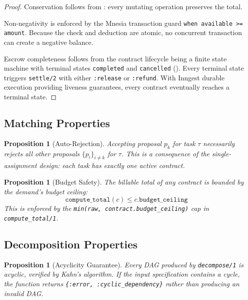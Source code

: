 \documentclass[12pt,a4paper]{article}
\theoremstyle{plain}
\newtheorem{proposition}[theorem]{Proposition}
\theoremstyle{definition}
\begin{document}
\begin{proof}
Conservation follows from : every mutating operation preserves the total.

Non-negativity is enforced by the Mnesia transaction guard \texttt{when available >= amount}. Because the check and deduction are atomic, no concurrent transaction can create a negative balance.

Escrow completeness follows from the contract lifecycle being a finite state machine with terminal states \texttt{completed} and \texttt{cancelled} (). Every terminal state triggers \texttt{settle/2} with either \texttt{:release} or \texttt{:refund}. With Inngest durable execution providing liveness guarantees, every contract eventually reaches a terminal state.
\end{proof}

\subsection{Matching Properties}

\begin{proposition}[Auto-Rejection]\label{prop:auto-reject}
Accepting proposal $p_k$ for task $\tau$ necessarily rejects all other proposals $\{p_i\}_{i \neq k}$ for $\tau$. This is a consequence of the single-assignment design: each task has exactly one active contract.
\end{proposition}

\begin{proposition}[Budget Safety]\label{prop:budget-safety}
The billable total of any contract is bounded by the demand's budget ceiling:
\[
    \texttt{compute\_total}(c) \leq c.\texttt{budget\_ceiling}
\]
This is enforced by the \texttt{min(raw, contract.budget\_ceiling)} cap in \texttt{compute\_total/1}.
\end{proposition}

\subsection{Decomposition Properties}

\begin{proposition}[Acyclicity Guarantee]\label{prop:acyclic}
Every DAG produced by \texttt{decompose/1} is acyclic, verified by Kahn's algorithm. If the input specification contains a cycle, the function returns \texttt{\{:error, :cyclic\_dependency\}} rather than producing an invalid DAG.
\end{proposition}
\end{document}
